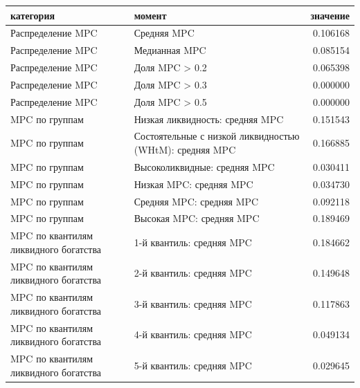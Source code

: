\begin{tabular}{llr}
\toprule
категория & момент & значение \\
\midrule
Распределение MPC & Средняя MPC & 0.106168 \\
Распределение MPC & Медианная MPC & 0.085154 \\
Распределение MPC & Доля MPC > 0.2 & 0.065398 \\
Распределение MPC & Доля MPC > 0.3 & 0.000000 \\
Распределение MPC & Доля MPC > 0.5 & 0.000000 \\
MPC по группам & Низкая ликвидность: средняя MPC & 0.151543 \\
MPC по группам & Состоятельные с низкой ликвидностью (WHtM): средняя MPC & 0.166885 \\
MPC по группам & Высоколиквидные: средняя MPC & 0.030411 \\
MPC по группам & Низкая MPC: средняя MPC & 0.034730 \\
MPC по группам & Средняя MPC: средняя MPC & 0.092118 \\
MPC по группам & Высокая MPC: средняя MPC & 0.189469 \\
MPC по квантилям ликвидного богатства & 1-й квантиль: средняя MPC & 0.184662 \\
MPC по квантилям ликвидного богатства & 2-й квантиль: средняя MPC & 0.149648 \\
MPC по квантилям ликвидного богатства & 3-й квантиль: средняя MPC & 0.117863 \\
MPC по квантилям ликвидного богатства & 4-й квантиль: средняя MPC & 0.049134 \\
MPC по квантилям ликвидного богатства & 5-й квантиль: средняя MPC & 0.029645 \\
\bottomrule
\end{tabular}
